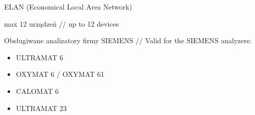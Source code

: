 ELAN (Economical Local Area Network)

max 12 urządzeń  // up to 12 devices

Obsługiwane analizatory firmy SIEMENS // Valid for the SIEMENS analyzers:
\begin{itemize}
\item ULTRAMAT 6
\item OXYMAT 6 / OXYMAT 61
\item CALOMAT 6
\item ULTRAMAT 23
\end{itemize}
